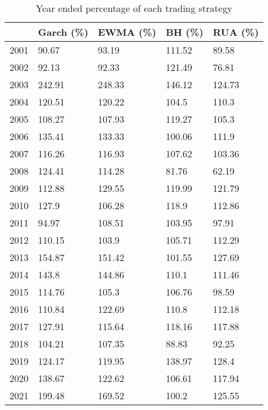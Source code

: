 \documentclass[11pts]{article}
\begin{document}
\begin{table}[H]
\centering
\begin{tabular}{lllll}
\hline
                          & Garch (\%) & EWMA (\%) & BH (\%) & RUA (\%) \\ \hline
\multicolumn{1}{l|}{2001} & 90.67      & 93.19    & 111.52 & 89.58   \\
\multicolumn{1}{l|}{2002} & 92.13      & 92.33    & 121.49 & 76.81   \\
\multicolumn{1}{l|}{2003} & 242.91     & 248.33   & 146.12 & 124.73  \\
\multicolumn{1}{l|}{2004} & 120.51     & 120.22   & 104.5  & 110.3   \\
\multicolumn{1}{l|}{2005} & 108.27     & 107.93   & 119.27 & 105.3   \\
\multicolumn{1}{l|}{2006} & 135.41     & 133.33   & 100.06 & 111.9   \\
\multicolumn{1}{l|}{2007} & 116.26     & 116.93   & 107.62 & 103.36  \\
\multicolumn{1}{l|}{2008} & 124.41     & 114.28   & 81.76  & 62.19   \\
\multicolumn{1}{l|}{2009} & 112.88     & 129.55   & 119.99 & 121.79  \\
\multicolumn{1}{l|}{2010} & 127.9      & 106.28   & 118.9  & 112.86  \\
\multicolumn{1}{l|}{2011} & 94.97      & 108.51   & 103.95 & 97.91   \\
\multicolumn{1}{l|}{2012} & 110.15     & 103.9    & 105.71 & 112.29  \\
\multicolumn{1}{l|}{2013} & 154.87     & 151.42   & 101.55 & 127.69  \\
\multicolumn{1}{l|}{2014} & 143.8      & 144.86   & 110.1  & 111.46  \\
\multicolumn{1}{l|}{2015} & 114.76     & 105.3    & 106.76 & 98.59   \\
\multicolumn{1}{l|}{2016} & 110.84     & 122.69   & 110.8  & 112.18  \\
\multicolumn{1}{l|}{2017} & 127.91     & 115.64   & 118.16 & 117.88  \\
\multicolumn{1}{l|}{2018} & 104.21     & 107.35   & 88.83  & 92.25   \\
\multicolumn{1}{l|}{2019} & 124.17     & 119.95   & 138.97 & 128.4   \\
\multicolumn{1}{l|}{2020} & 138.67     & 122.62   & 106.61 & 117.94  \\
\multicolumn{1}{l|}{2021} & 199.48     & 169.52   & 100.2  & 125.55  \\ \hline
\end{tabular}
\caption{Year ended percentage of each trading strategy}
\label{tab:2}
\end{table}
\end{document}
